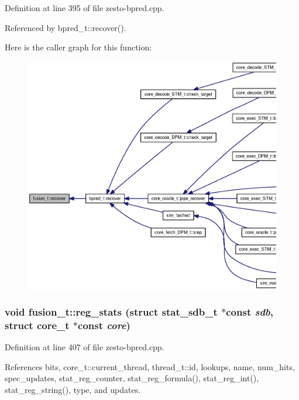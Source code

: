 Definition at line 395 of file zesto-bpred.cpp.

Referenced by bpred\_\-t::recover().

Here is the caller graph for this function:\nopagebreak
\begin{figure}[H]
\begin{center}
\leavevmode
\includegraphics[width=420pt]{classfusion__t_fa7bc7d99f4556983efd089a60664cee_icgraph}
\end{center}
\end{figure}
\subsubsection[{reg\_\-stats}]{\setlength{\rightskip}{0pt plus 5cm}void fusion\_\-t::reg\_\-stats (struct {\bf stat\_\-sdb\_\-t} $\ast$const  {\em sdb}, \/  struct {\bf core\_\-t} $\ast$const  {\em core})\hspace{0.3cm}{\tt  [virtual]}}\label{classfusion__t_45c940f6458a028bd8a86684e5edce4a}




Definition at line 407 of file zesto-bpred.cpp.

References bits, core\_\-t::current\_\-thread, thread\_\-t::id, lookups, name, num\_\-hits, spec\_\-updates, stat\_\-reg\_\-counter, stat\_\-reg\_\-formula(), stat\_\-reg\_\-int(), stat\_\-reg\_\-string(), type, and updates.

